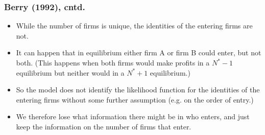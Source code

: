 \begin{frame}%

\frametitle{Berry (1992), cntd.}

\begin{itemize}
\item While the number of firms is unique, the identities of the entering
firms are not.

\item It can happen that in equilibrium either firm A or firm B could enter,
but not both. (This happens when both firms would make profits in a $N^{\ast
}-1$ equilibrium but neither would in a $N^{\ast }+1$ equilibrium.)

\item So the model does not identify the likelihood function for the
identities of the entering firms without some further assumption (e.g. on
the order of entry.)

\item We therefore lose what information there might be in who enters, and
just keep the information on the number of firms that enter.
\end{itemize}

\end{frame}%

